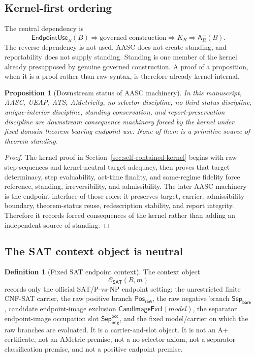 \documentclass[11pt]{article}
\newtheorem{proposition}[theorem]{Proposition}
\theoremstyle{definition}
\newtheorem{definition}[theorem]{Definition}
\theoremstyle{remark}
\newcommand{\PosRaw}{\mathsf{Pos}_{\mathsf{raw}}}
\newcommand{\SepBare}{\mathsf{Sep}_{\mathsf{bare}}}
\newcommand{\SepImgOcc}{\mathsf{Sep}_{\mathsf{img}}^{\mathsf{occ}}}
\newcommand{\Aplus}{\mathsf{A}^{+}}
\newcommand{\ClayCtx}{\mathcal{C}_{\mathsf{SAT}}(R,m)}
\newcommand{\EndpointUse}{\mathsf{EndpointUse}}
\newcommand{\CandImageExcl}{\mathsf{CandImageExcl}}
\begin{document}
\subsection{Kernel-first ordering}
The central dependency is
\[
  \EndpointUse_R(B)
  \Rightarrow
  \text{governed construction}
  \Rightarrow
  K_R
  \Rightarrow
  \Aplus_R(B).
\]
The reverse dependency is not used. AASC does not create standing, and reportability does not supply standing. Standing is one member of the kernel already presupposed by genuine governed construction. A proof of a proposition, when it is a proof rather than raw syntax, is therefore already kernel-internal.

\begin{proposition}[Downstream status of AASC machinery]\label{prop:aasc-downstream-status}
In this manuscript, AASC, UEAP, ATS, AMetricity, no-selector discipline, no-third-status discipline, unique-interior discipline, standing conservation, and report-preservation discipline are downstream consequence machinery forced by the kernel under fixed-domain theorem-bearing endpoint use. None of them is a primitive source of theorem standing.
\end{proposition}

\begin{proof}
The kernel proof in Section~\ref{sec:self-contained-kernel} begins with raw step-sequences and kernel-neutral target adequacy, then proves that target determinacy, step evaluability, act-time finality, and same-regime fidelity force reference, standing, irreversibility, and admissibility. The later AASC machinery is the endpoint interface of those roles: it preserves target, carrier, admissibility boundary, theorem-status reuse, redescription stability, and report integrity. Therefore it records forced consequences of the kernel rather than adding an independent source of standing.
\end{proof}

\subsection{The SAT context object is neutral}

\begin{definition}[Fixed SAT endpoint context]\label{def:context}
The context object
\[
  \ClayCtx
\]
records only the official SAT/P-vs-NP endpoint setting: the unrestricted finite CNF-SAT carrier, the raw positive branch \(\PosRaw\), the raw negative branch \(\SepBare\), candidate endpoint-image exclusion \(\CandImageExcl(model)\), the separator endpoint-image occupation slot \(\SepImgOcc\), and the fixed model/carrier on which the raw branches are evaluated. It is a carrier-and-slot object. It is not an A+ certificate, not an AMetric premise, not a no-selector axiom, not a separator-classification premise, and not a positive endpoint premise.
\end{definition}
\end{document}
